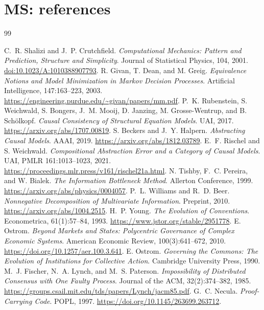 \documentclass[11pt,oneside,openany]{book}
\numberwithin{equation}{section}
\begin{document}
\chapter{MS: references}
\begin{thebibliography}{99}
\small
\setlength{\itemsep}{.12em}
\setlength{\parsep}{0pt}
\raggedright
{}
{} C.~R. Shalizi and J.~P. Crutchfield. \emph{Computational Mechanics: Pattern and Prediction, Structure and Simplicity}. Journal of Statistical Physics, 104, 2001. \href{https://doi.org/10.1023/A:1010388907793}{doi:10.1023/A:1010388907793}.
 R. Givan, T. Dean, and M. Greig. \emph{Equivalence Notions and Model Minimization in Markov Decision Processes}. Artificial Intelligence, 147:163--223, 2003. \url{https://engineering.purdue.edu/~givan/papers/mm.pdf}.
 P.~K. Rubenstein, S. Weichwald, S. Bongers, J.~M. Mooij, D. Janzing, M. Grosse-Wentrup, and B. Sch\"olkopf. \emph{Causal Consistency of Structural Equation Models}. UAI, 2017. \url{https://arxiv.org/abs/1707.00819}.
 S. Beckers and J.~Y. Halpern. \emph{Abstracting Causal Models}. AAAI, 2019. \url{https://arxiv.org/abs/1812.03789}.
 E.~F. Rischel and S. Weichwald. \emph{Compositional Abstraction Error and a Category of Causal Models}. UAI, PMLR 161:1013--1023, 2021. \url{https://proceedings.mlr.press/v161/rischel21a.html}.
 N. Tishby, F.~C. Pereira, and W. Bialek. \emph{The Information Bottleneck Method}. Allerton Conference, 1999. \url{https://arxiv.org/abs/physics/0004057}.
 P.~L. Williams and R.~D. Beer. \emph{Nonnegative Decomposition of Multivariate Information}. Preprint, 2010. \url{https://arxiv.org/abs/1004.2515}.
 H.~P. Young. \emph{The Evolution of Conventions}. Econometrica, 61(1):57--84, 1993. \url{https://www.jstor.org/stable/2951778}.
 E. Ostrom. \emph{Beyond Markets and States: Polycentric Governance of Complex Economic Systems}. American Economic Review, 100(3):641--672, 2010. \url{https://doi.org/10.1257/aer.100.3.641}.
 E. Ostrom. \emph{Governing the Commons: The Evolution of Institutions for Collective Action}. Cambridge University Press, 1990.
 M.~J. Fischer, N.~A. Lynch, and M.~S. Paterson. \emph{Impossibility of Distributed Consensus with One Faulty Process}. Journal of the ACM, 32(2):374--382, 1985. \url{https://groups.csail.mit.edu/tds/papers/Lynch/jacm85.pdf}.
 G.~C. Necula. \emph{Proof-Carrying Code}. POPL, 1997. \url{https://doi.org/10.1145/263699.263712}.

\end{thebibliography}
\end{document}
